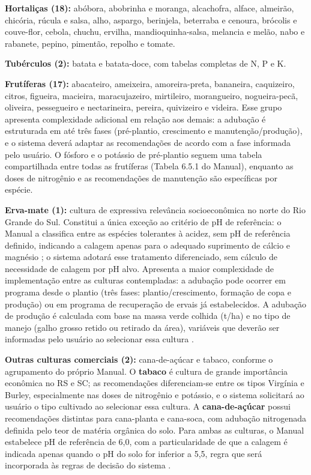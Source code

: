 \textbf{Hortaliças (18):} abóbora, abobrinha e moranga, alcachofra, alface,
almeirão, chicória, rúcula e salsa, alho, aspargo, berinjela, beterraba e cenoura,
brócolis e couve-flor, cebola, chuchu, ervilha, mandioquinha-salsa,
melancia e melão, nabo e rabanete, pepino, pimentão, repolho e tomate.

\textbf{Tubérculos (2):} batata e batata-doce, com tabelas completas de
N, P e K.

\textbf{Frutíferas (17):} abacateiro, ameixeira, amoreira-preta, bananeira,
caquizeiro, citros, figueira, macieira, maracujazeiro, mirtileiro, morangueiro,
nogueira-pecã, oliveira, pessegueiro e nectarineira, pereira, quivizeiro e videira.
Esse grupo apresenta complexidade adicional em relação aos demais: a adubação
é estruturada em até três fases (pré-plantio, crescimento e manutenção/produção),
e o sistema deverá adaptar as recomendações de acordo com a fase informada pelo
usuário. O fósforo e o potássio de pré-plantio seguem uma tabela compartilhada
entre todas as frutíferas (Tabela 6.5.1 do Manual), enquanto as doses de
nitrogênio e as recomendações de manutenção são específicas por espécie.

\textbf{Erva-mate (1):} cultura de expressiva relevância socioeconômica no
norte do Rio Grande do Sul. Constitui a única exceção ao critério de pH de
referência: o Manual a classifica entre as espécies tolerantes à acidez,
sem pH de referência definido, indicando a calagem apenas para o adequado
suprimento de cálcio e magnésio \citep{ManualCalagem2016}; o sistema
adotará esse tratamento diferenciado, sem cálculo de necessidade de
calagem por pH alvo. Apresenta a maior complexidade de implementação
entre as culturas contempladas: a adubação pode ocorrer em programa desde
o plantio (três fases: plantio/crescimento, formação de copa e produção) ou
em programa de recuperação de ervais já estabelecidos. A adubação de produção
é calculada com base na massa verde colhida (t/ha) e no tipo de manejo
(galho grosso retido ou retirado da área), variáveis que deverão ser informadas
pelo usuário ao selecionar essa cultura \citep{ManualCalagem2016}.

\textbf{Outras culturas comerciais (2):} cana-de-açúcar e tabaco, conforme
o agrupamento do próprio Manual. O \textbf{tabaco} é cultura de grande
importância econômica no RS e SC; as recomendações diferenciam-se entre os
tipos Virgínia e Burley, especialmente nas doses de nitrogênio e potássio,
e o sistema solicitará ao usuário o tipo cultivado ao selecionar essa
cultura. A \textbf{cana-de-açúcar} possui recomendações distintas para
cana-planta e cana-soca, com adubação nitrogenada definida pelo teor de
matéria orgânica do solo. Para ambas as culturas, o Manual estabelece pH
de referência de 6,0, com a particularidade de que a calagem é indicada
apenas quando o pH do solo for inferior a 5,5, regra que será incorporada
às regras de decisão do sistema \citep{ManualCalagem2016}.

